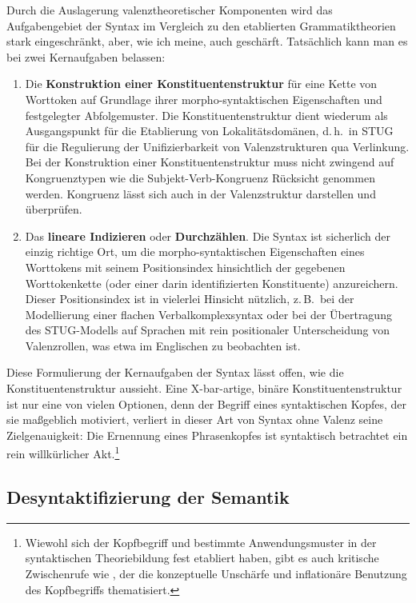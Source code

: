 {Durch die Auslagerung valenztheoretischer Komponenten wird das Aufgabengebiet der Syntax im Vergleich zu den etablierten Grammatiktheorien stark eingeschränkt, aber, wie ich meine, auch geschärft. Tatsächlich kann man es bei zwei Kernaufgaben belassen: 

\begin{enumerate}
  \item Die {\bf Konstruktion einer Konstituentenstruktur} für eine Kette von Worttoken auf Grundlage ihrer morpho-syntaktischen Eigenschaften und festgelegter Abfolgemuster. Die Konstituentenstruktur dient wiederum als Ausgangspunkt für die Etablierung von Lokalitätsdomänen, d.\,h.\ in STUG für die Regulierung der Unifizierbarkeit von Valenzstrukturen qua Verlinkung. Bei der Konstruktion einer Konstituentenstruktur muss nicht zwingend auf  Kongruenztypen wie die Subjekt-Verb-Kongruenz Rücksicht genommen werden. Kongruenz lässt sich auch in der Valenzstruktur darstellen und überprüfen.   
  \item Das {\bf lineare Indizieren} oder {\bf Durchzählen}. Die Syntax ist sicherlich der einzig richtige Ort, um die morpho-syntaktischen Eigenschaften eines Worttokens mit seinem Positionsindex hinsichtlich der gegebenen Worttokenkette (oder einer darin identifizierten Konstituente) anzureichern. Dieser Positionsindex ist in vielerlei Hinsicht nützlich, z.\,B.\ bei der Modellierung einer flachen Verbalkomplexsyntax oder bei der Übertragung des STUG-Modells auf Sprachen mit rein positionaler Unterscheidung von Valenzrollen, was etwa im Englischen zu beobachten ist.  
\end{enumerate}  
Diese Formulierung der Kernaufgaben der Syntax lässt offen, wie die Konstituentenstruktur aussieht. Eine X-bar-artige, binäre Konstituentenstruktur ist nur eine von vielen Optionen, denn der Begriff eines syntaktischen Kopfes, der sie ma\ss geblich motiviert, verliert in dieser Art von Syntax ohne Valenz seine Zielgenauigkeit: Die Ernennung eines Phrasenkopfes ist syntaktisch betrachtet ein rein willkürlicher Akt.\footnote{Wiewohl sich der Kopfbegriff und bestimmte Anwendungsmuster in der syntaktischen Theoriebildung fest etabliert haben, gibt es auch kritische Zwischenrufe wie \cite{Matthews:07}, der die konzeptuelle Unschärfe und inflationäre Benutzung des Kopfbegriffs thematisiert.}
   

  



\subsection{Desyntaktifizierung der Semantik}

}
